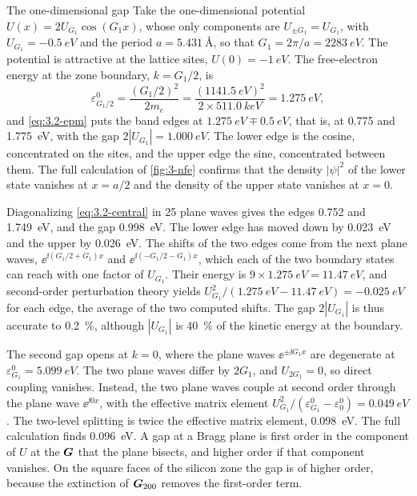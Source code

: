 \begin{workedexample}{The one-dimensional gap}\label{we:3-gap1d}
Take the one-dimensional potential $U(x) = 2U_{G_1}\cos(G_1x)$, whose only components are $U_{\pm G_1} = U_{G_1}$, with $U_{G_1} = \SI{-0.5}{eV}$ and the period $a = \SI{5.431}{\angstrom}$, so that $G_1 = 2\pi/a = \SI{2283}{eV}$. The potential is attractive at the lattice sites, $U(0) = \SI{-1}{eV}$. The free-electron energy at the zone boundary, $k = G_1/2$, is
\begin{equation*}
  \varepsilon^0_{G_1/2} = \frac{(G_1/2)^2}{2m_e} = \frac{(\SI{1141.5}{eV})^2}{2\times\SI{511.0}{keV}} = \SI{1.275}{eV} ,
\end{equation*}
and \cref{eq:3.2-epm} puts the band edges at $\SI{1.275}{eV} \mp \SI{0.5}{eV}$, that is, at 0.775 and \SI{1.775}{eV}, with the gap $2|U_{G_1}| = \SI{1.000}{eV}$. The lower edge is the cosine, concentrated on the sites, and the upper edge the sine, concentrated between them. The full calculation of \cref{fig:3-nfe} confirms that the density $|\psi|^2$ of the lower state vanishes at $x = a/2$ and the density of the upper state vanishes at $x = 0$.

Diagonalizing \cref{eq:3.2-central} in 25 plane waves gives the edges 0.752 and \SI{1.749}{eV}, and the gap \SI{0.998}{eV}. The lower edge has moved down by \SI{0.023}{eV} and the upper by \SI{0.026}{eV}. The shifts of the two edges come from the next plane waves, $\ee^{\ii(G_1/2 + G_1)x}$ and $\ee^{\ii(-G_1/2 - G_1)x}$, which each of the two boundary states can reach with one factor of $U_{G_1}$. Their energy is $9\times\SI{1.275}{eV} = \SI{11.47}{eV}$, and second-order perturbation theory yields $U_{G_1}^2/(\SI{1.275}{eV} - \SI{11.47}{eV}) = \SI{-0.025}{eV}$ for each edge, the average of the two computed shifts. The gap $2|U_{G_1}|$ is thus accurate to \SI{0.2}{\percent}, although $|U_{G_1}|$ is \SI{40}{\percent} of the kinetic energy at the boundary.

The second gap opens at $k = 0$, where the plane waves $\ee^{\pm\ii G_1x}$ are degenerate at $\varepsilon^0_{G_1} = \SI{5.099}{eV}$. The two plane waves differ by $2G_1$, and $U_{2G_1} = 0$, so direct coupling vanishes. Instead, the two plane waves couple at second order through the plane wave $\ee^{\ii0x}$, with the effective matrix element $U_{G_1}^2/(\varepsilon^0_{G_1} - \varepsilon^0_0) = \SI{0.049}{eV}$. The two-level splitting is twice the effective matrix element, \SI{0.098}{eV}. The full calculation finds \SI{0.096}{eV}. A gap at a Bragg plane is first order in the component of $U$ at the $\bm{G}$ that the plane bisects, and higher order if that component vanishes. On the square faces of the silicon zone the gap is of higher order, because the extinction of $\bm{G}_{200}$ removes the first-order term.
\end{workedexample}

